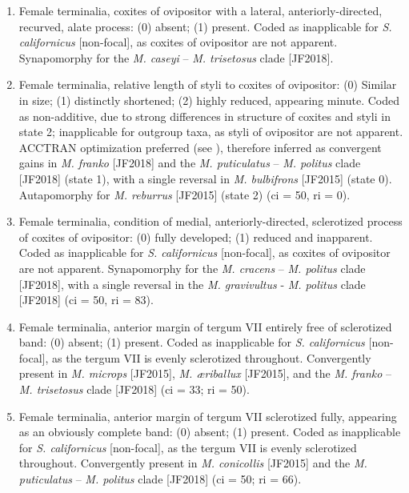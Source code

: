 \documentclass[fleqn,10pt,lineno]{wlpeerj} %
\begin{document}
\begin{enumerate}
		\item Female terminalia, coxites of ovipositor with a lateral, anteriorly-directed, recurved, alate process: (0) absent; (1) present. Coded as inapplicable for \textit{S. californicus} [non-focal], as coxites of ovipositor are not apparent. Synapomorphy for the \textit{M. caseyi} – \textit{M. trisetosus} clade [JF2018].
		
		\item Female terminalia, relative length of styli to coxites of ovipositor: (0) Similar in size; (1) distinctly shortened; (2) highly reduced, appearing minute. Coded as non-additive, due to strong differences in structure of coxites and styli in state 2; inapplicable for outgroup taxa, as styli of ovipositor are not apparent. ACCTRAN optimization preferred (see \citealt{agnarsson2008}), therefore inferred as convergent gains in \textit{M. franko} [JF2018] and the \textit{M. puticulatus} – \textit{M. politus} clade [JF2018] (state 1), with a single reversal in \textit{M. bulbifrons} [JF2015] (state 0). Autapomorphy for \textit{M. reburrus} [JF2015] (state 2) (ci = 50, ri = 0).
		
		\item Female terminalia, condition of medial, anteriorly-directed, sclerotized process of coxites of ovipositor: (0) fully developed; (1) reduced and inapparent. Coded as inapplicable for \textit{S. californicus} [non-focal], as coxites of ovipositor are not apparent. Synapomorphy for the \textit{M. cracens} – \textit{M. politus} clade [JF2018], with a single reversal in the \textit{M. gravivultus} - \textit{M. politus} clade [JF2018] (ci = 50, ri = 83).
		
		\item Female terminalia, anterior margin of tergum VII entirely free of sclerotized band: (0) absent; (1) present. Coded as inapplicable for \textit{S. californicus} [non-focal], as the tergum VII is evenly sclerotized throughout. Convergently present in \textit{M. microps} [JF2015], \textit{M. {\ae}riballux} [JF2015], and the \textit{M. franko} – \textit{M. trisetosus} clade [JF2018] (ci = 33; ri = 50).
		
		\item Female terminalia, anterior margin of tergum VII sclerotized fully, appearing as an obviously complete band: (0) absent; (1) present. Coded as inapplicable for \textit{S. californicus} [non-focal], as the tergum VII is evenly sclerotized throughout. Convergently present in \textit{M. conicollis} [JF2015] and the \textit{M. puticulatus} – \textit{M. politus} clade [JF2018] (ci = 50; ri = 66).
		

\end{enumerate}
\end{document}
